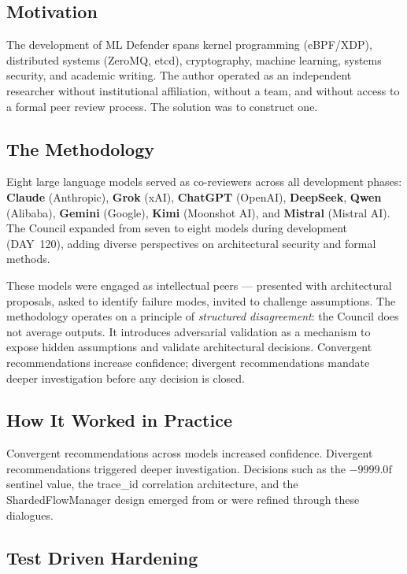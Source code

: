 \documentclass[11pt,a4paper]{article}
\begin{document}
    \subsection{Motivation}

    The development of ML Defender spans kernel programming (eBPF/XDP), distributed systems
    (ZeroMQ, etcd), cryptography, machine learning, systems security, and academic writing. The
    author operated as an independent researcher without institutional affiliation, without a
    team, and without access to a formal peer review process. The solution was to construct one.

    \subsection{The Methodology}

    Eight large language models served as co-reviewers across all development phases:
    \textbf{Claude} (Anthropic), \textbf{Grok} (xAI), \textbf{ChatGPT} (OpenAI),
    \textbf{DeepSeek}, \textbf{Qwen} (Alibaba), \textbf{Gemini} (Google),
    \textbf{Kimi} (Moonshot AI), and \textbf{Mistral} (Mistral AI).
    The Council expanded from seven to eight models during development (DAY~120),
    adding diverse perspectives on architectural security and formal methods.

    These models were engaged as intellectual peers --- presented with architectural proposals,
    asked to identify failure modes, invited to challenge assumptions. The methodology operates
    on a principle of \emph{structured disagreement}: the Council does not average outputs.
    It introduces adversarial validation as a mechanism to expose hidden assumptions and
    validate architectural decisions. Convergent recommendations increase confidence; divergent
    recommendations mandate deeper investigation before any decision is closed.

    \subsection{How It Worked in Practice}

    Convergent recommendations across models increased confidence. Divergent recommendations
    triggered deeper investigation. Decisions such as the $-9999.0\text{f}$ sentinel value, the
    trace\_id correlation architecture, and the ShardedFlowManager design emerged from or were
    refined through these dialogues.

    \subsection{Test Driven Hardening}
    \label{subsec:tdh}
\end{document}
